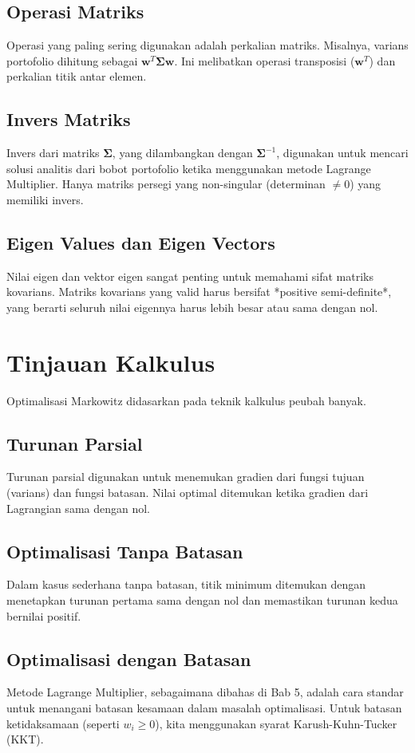 \documentclass[12pt,a4paper]{book}
\begin{document}
\section{Operasi Matriks}
Operasi yang paling sering digunakan adalah perkalian matriks. Misalnya, varians portofolio dihitung sebagai $\mathbf{w}^T \mathbf{\Sigma} \mathbf{w}$. Ini melibatkan operasi transposisi ($\mathbf{w}^T$) dan perkalian titik antar elemen.

\section{Invers Matriks}
Invers dari matriks $\mathbf{\Sigma}$, yang dilambangkan dengan $\mathbf{\Sigma}^{-1}$, digunakan untuk mencari solusi analitis dari bobot portofolio ketika menggunakan metode Lagrange Multiplier. Hanya matriks persegi yang non-singular (determinan $\neq 0$) yang memiliki invers.

\section{Eigen Values dan Eigen Vectors}
Nilai eigen dan vektor eigen sangat penting untuk memahami sifat matriks kovarians. Matriks kovarians yang valid harus bersifat *positive semi-definite*, yang berarti seluruh nilai eigennya harus lebih besar atau sama dengan nol.

\chapter{Tinjauan Kalkulus}
Optimalisasi Markowitz didasarkan pada teknik kalkulus peubah banyak.

\section{Turunan Parsial}
Turunan parsial digunakan untuk menemukan gradien dari fungsi tujuan (varians) dan fungsi batasan. Nilai optimal ditemukan ketika gradien dari Lagrangian sama dengan nol.

\section{Optimalisasi Tanpa Batasan}
Dalam kasus sederhana tanpa batasan, titik minimum ditemukan dengan menetapkan turunan pertama sama dengan nol dan memastikan turunan kedua bernilai positif.

\section{Optimalisasi dengan Batasan}
Metode Lagrange Multiplier, sebagaimana dibahas di Bab 5, adalah cara standar untuk menangani batasan kesamaan dalam masalah optimalisasi. Untuk batasan ketidaksamaan (seperti $w_i \ge 0$), kita menggunakan syarat Karush-Kuhn-Tucker (KKT).
\end{document}

